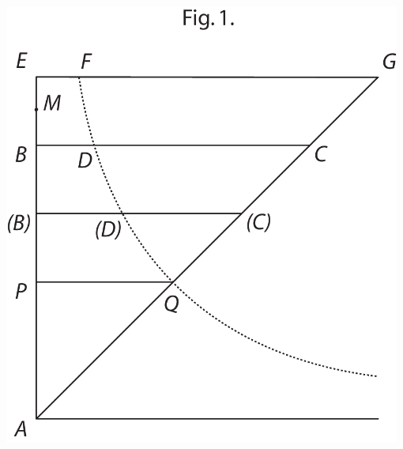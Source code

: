 %
\noindent
\begin{minipage}[t]{0.5\textwidth}
\includegraphics[trim = 0mm 0mm 0mm 17mm, clip, width=0.98\textwidth]{images/lh0350911_002r-d1.pdf}
\end{minipage}
\hspace*{5mm}
\vspace*{0.5mm}
